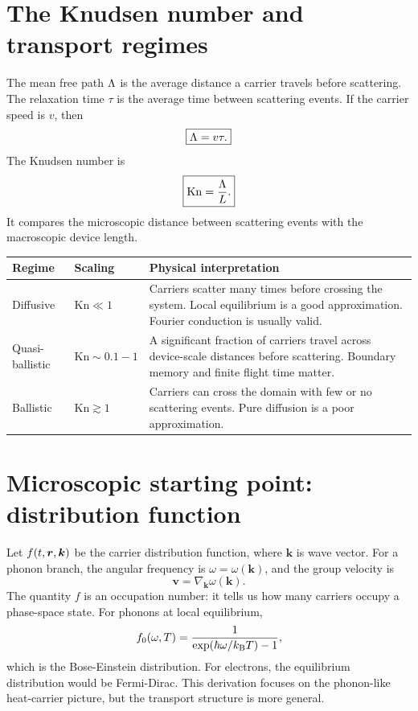 \documentclass[11pt]{article}
\begin{document}
\section{The Knudsen number and transport regimes}
The mean free path \(\Lambda\) is the average distance a carrier travels before scattering. The relaxation time \(\tau\) is the average time between scattering events. If the carrier speed is \(v\), then
\begin{equation}
    \boxed{\Lambda=v\tau.}
    \label{eq:mfp_def}
\end{equation}
The Knudsen number is
\begin{equation}
    \boxed{\mathrm{Kn}=\frac{\Lambda}{L}.}
    \label{eq:kn_def}
\end{equation}
It compares the microscopic distance between scattering events with the macroscopic device length.

\begin{center}
\begin{tabularx}{0.95\textwidth}{>{\RaggedRight\arraybackslash}p{}>{\RaggedRight\arraybackslash}p{}>{\RaggedRight\arraybackslash}X}
\toprule
Regime & Scaling & Physical interpretation \\
\midrule
Diffusive & \(\mathrm{Kn}\ll 1\) & Carriers scatter many times before crossing the system. Local equilibrium is a good approximation. Fourier conduction is usually valid. \\
Quasi-ballistic & \(\mathrm{Kn}\sim 0.1-1\) & A significant fraction of carriers travel across device-scale distances before scattering. Boundary memory and finite flight time matter. \\
Ballistic & \(\mathrm{Kn}\gtrsim 1\) & Carriers can cross the domain with few or no scattering events. Pure diffusion is a poor approximation. \\
\bottomrule
\end{tabularx}
\end{center}

\section{Microscopic starting point: distribution function}
Let \(f(t,\bm{r},\bm{k})\) be the carrier distribution function, where \(\bm{k}\) is wave vector. For a phonon branch, the angular frequency is \(\omega=\omega(\bm{k})\), and the group velocity is
\begin{equation}
    \bm{v}=\nabla_{\bm{k}}\omega(\bm{k}).
\end{equation}
The quantity \(f\) is an occupation number: it tells us how many carriers occupy a phase-space state. For phonons at local equilibrium,
\begin{equation}
    f_0(\omega,T)=\frac{1}{\exp(\hbar\omega/k_{\mathrm{B}} T)-1},
\end{equation}
which is the Bose-Einstein distribution. For electrons, the equilibrium distribution would be Fermi-Dirac. This derivation focuses on the phonon-like heat-carrier picture, but the transport structure is more general.
\end{document}
